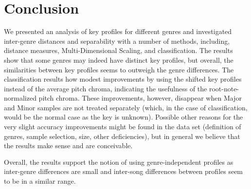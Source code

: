 \documentclass{article}
\begin{document}
\section{Conclusion}
We presented an analysis of key profiles for different genres and investigated inter-genre distances and separability with a number of methods, including, distance measures, Multi-Dimensional Scaling, and classification. The results show that some genres may indeed have distinct key profiles, but overall, the similarities between key profiles seems to outweigh the genre differences. The classification results how modest improvements by using the shifted key profiles instead of the average pitch chroma, indicating the usefulness of the root-note-normalized pitch chroma. These improvements, however, disappear when Major and Minor samples are not treated separately (which, in the case of classification, would be the normal case as the key is unknown). Possible other reasons for the very slight accuracy improvements might be found in the data set (definition of genres, sample selection, size, other deficiencies), but in general we believe that the results make sense and are conceivable.

Overall, the results support the notion of using genre-independent profiles as inter-genre differences are small and inter-song differences between profiles seem to be in a similar range. 

\end{document}

